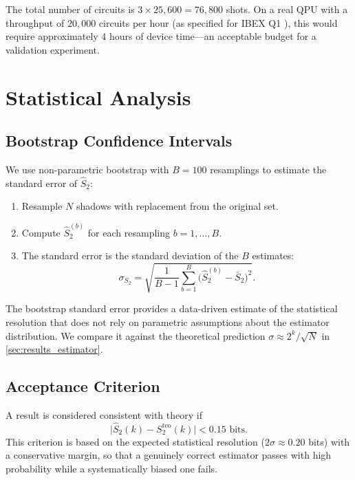 \documentclass[12pt,a4paper,oneside]{book}
\theoremstyle{plain}
\theoremstyle{definition}
\theoremstyle{remark}
\begin{document}
The total number of circuits is $3 \times 25{,}600 = 76{,}800$ shots. On a real QPU with a throughput of $20{,}000$ circuits per hour (as specified for IBEX Q1 \cite{aqt_ibex}), this would require approximately 4 hours of device time---an acceptable budget for a validation experiment.

\section{Statistical Analysis}
\label{sec:statistical}

\subsection{Bootstrap Confidence Intervals}

We use non-parametric bootstrap with $B = 100$ resamplings to estimate the standard error of $\widehat{S}_2$:
\begin{enumerate}[itemsep=2pt]
    \item Resample $N$ shadows with replacement from the original set.
    \item Compute $\widehat{S}_2^{(b)}$ for each resampling $b = 1, \dots, B$.
    \item The standard error is the standard deviation of the $B$ estimates:
    \begin{equation}
        \sigma_{S_2} = \sqrt{\frac{1}{B-1} \sum_{b=1}^{B} \bigl(\widehat{S}_2^{(b)} - \bar{S}_2\bigr)^2}.
    \end{equation}
\end{enumerate}

The bootstrap standard error provides a data-driven estimate of the statistical resolution that does not rely on parametric assumptions about the estimator distribution. We compare it against the theoretical prediction $\sigma \approx 2^k / \sqrt{N}$ in \cref{sec:results_estimator}.

\subsection{Acceptance Criterion}

A result is considered consistent with theory if
\begin{equation}
    \label{eq:acceptance}
    \bigl|\widehat{S}_2(k) - S_2^{\text{teo}}(k)\bigr| < 0.15 \text{ bits}.
\end{equation}
This criterion is based on the expected statistical resolution ($2\sigma \approx 0.20$ bits) with a conservative margin, so that a genuinely correct estimator passes with high probability while a systematically biased one fails.
\end{document}
